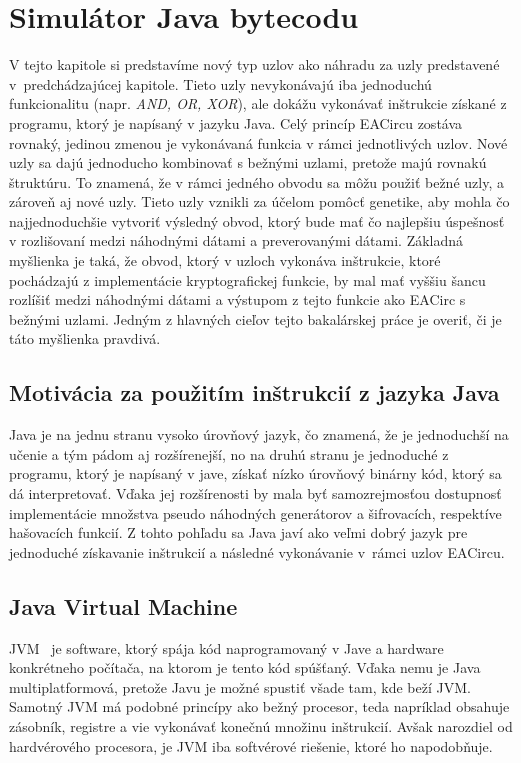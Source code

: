 \chapter{Simulátor Java bytecodu}
\label{chap:eacirc-jvmsim}

V tejto kapitole si predstavíme nový typ uzlov ako náhradu za uzly predstavené v~predchádzajúcej kapitole. Tieto uzly nevykonávajú iba jednoduchú funkcionalitu (napr. \textit{AND, OR, XOR}), ale dokážu vykonávať inštrukcie získané z programu, ktorý je napísaný v jazyku Java. Celý princíp EACircu zostáva rovnaký, jedinou zmenou je vykonávaná funkcia v rámci jednotlivých uzlov. Nové uzly sa dajú jednoducho kombinovať s bežnými uzlami, pretože majú rovnakú štruktúru. To znamená, že v rámci jedného obvodu sa môžu použiť bežné uzly, a zároveň aj nové uzly. Tieto uzly vznikli za účelom pomôcť genetike, aby mohla čo najjednoduchšie vytvoriť výsledný obvod, ktorý bude mať čo najlepšiu úspešnosť v rozlišovaní medzi náhodnými dátami a preverovanými dátami. Základná myšlienka je taká, že obvod, ktorý v uzloch vykonáva inštrukcie, ktoré pochádzajú z implementácie kryptografickej funkcie, by mal mať vyššiu šancu rozlíšiť medzi náhodnými dátami a výstupom z tejto funkcie ako EACirc s bežnými uzlami. Jedným z hlavných cieľov tejto bakalárskej práce je overiť, či je táto myšlienka pravdivá.

\section{Motivácia za použitím inštrukcií z jazyka Java}
\label{sec:java-bytecode}

Java je na jednu stranu vysoko úrovňový jazyk, čo znamená, že je jednoduchší na učenie a tým pádom aj rozšírenejší, no na druhú stranu je jednoduché z programu, ktorý je napísaný v jave, získať nízko úrovňový binárny kód, ktorý sa dá interpretovať. Vďaka jej rozšírenosti by mala byť samozrejmosťou dostupnosť implementácie množstva pseudo náhodných generátorov a šifrovacích, respektíve hašovacích funkcií. Z tohto pohľadu sa Java javí ako veľmi dobrý jazyk pre jednoduché získavanie inštrukcií a následné vykonávanie v~rámci uzlov EACircu.

\section{Java Virtual Machine}
\label{sec:jvm}

JVM~\parencite{JVM} je software, ktorý spája kód naprogramovaný v Jave a hardware konkrétneho počítača, na ktorom je tento kód spúšťaný. Vďaka nemu je Java multiplatformová, pretože Javu je možné spustiť všade tam, kde beží JVM. Samotný JVM má podobné princípy ako bežný procesor, teda napríklad obsahuje zásobník, registre a vie vykonávať konečnú množinu inštrukcií. Avšak narozdiel od hardvérového procesora, je JVM iba softvérové riešenie, ktoré ho napodobňuje.

